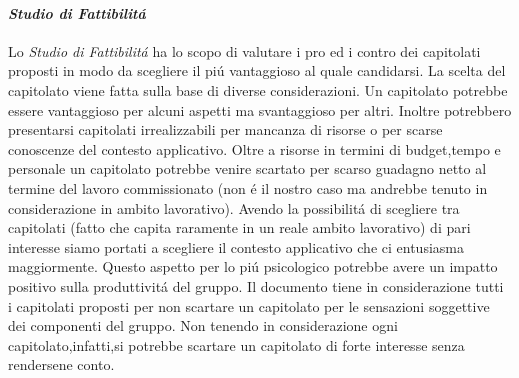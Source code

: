 \paragraph{\textit{Studio di Fattibilitá}}
Lo \textit{Studio di Fattibilitá} ha lo scopo di valutare i pro ed i contro dei capitolati proposti in modo da scegliere il piú vantaggioso al quale candidarsi.
La scelta del capitolato viene fatta sulla base di diverse considerazioni.
Un capitolato potrebbe essere vantaggioso per alcuni aspetti ma svantaggioso per altri.
Inoltre potrebbero presentarsi capitolati irrealizzabili per mancanza di risorse o per scarse conoscenze del contesto applicativo.
Oltre a risorse in termini di budget,tempo e personale un capitolato potrebbe venire scartato per scarso guadagno netto al termine del lavoro commissionato (non é il nostro caso ma 
andrebbe tenuto in considerazione in ambito lavorativo).
Avendo la possibilitá di scegliere tra capitolati (fatto che capita raramente in un reale ambito lavorativo) di pari interesse siamo portati a scegliere il contesto applicativo che ci entusiasma maggiormente.
Questo aspetto per lo piú psicologico potrebbe avere un impatto positivo sulla produttivitá del gruppo.
Il documento tiene in considerazione tutti i capitolati proposti per non scartare un capitolato per le sensazioni soggettive dei componenti del gruppo.
Non tenendo in considerazione ogni capitolato,infatti,si potrebbe scartare un capitolato di forte interesse senza rendersene conto.
